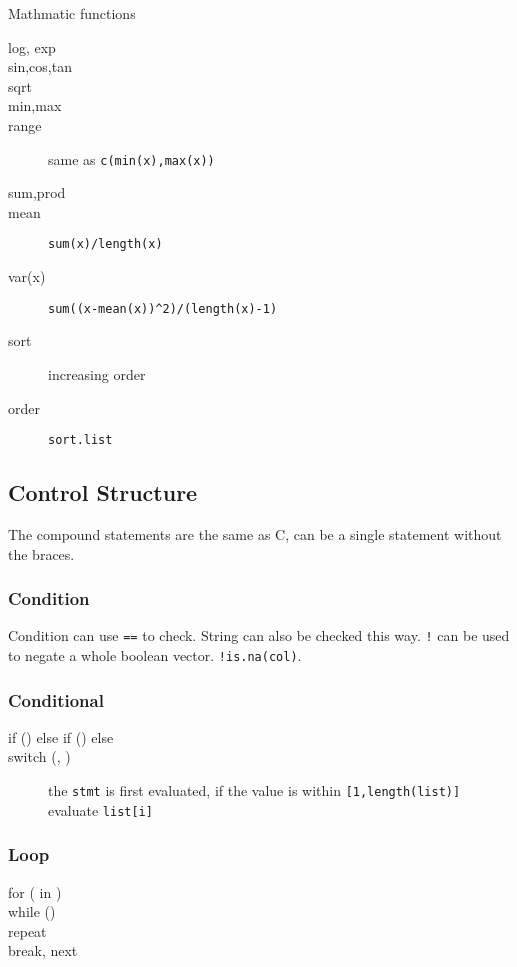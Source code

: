 Mathmatic functions
\begin{description}
\item [log, exp]
\item [sin,cos,tan]
\item [sqrt]
\item [min,max]
\item [range] same as \texttt{c(min(x),max(x))}
\item [sum,prod]
\item [mean] \texttt{sum(x)/length(x)}
\item [var(x)] \verb$sum((x-mean(x))^2)/(length(x)-1)$
\item [sort] increasing order
\item [order] \texttt{sort.list}
\end{description}


\subsection{Control Structure}
The compound statements are the same as C, can be a single statement
without the braces.

\subsubsection{Condition}
Condition can use \texttt{==} to check. String can also be checked
this way. \texttt{!} can be used to negate a whole boolean
vector. \texttt{!is.na(col)}.

\subsubsection{Conditional}

\begin{description}
\item [if ()  else if ()  else ]
\item [switch (, )] the \texttt{stmt} is first
  evaluated, if the value is within \texttt{[1,length(list)]} evaluate
  \texttt{list[i]}
\end{description}

\subsubsection{Loop}
\begin{description}
\item [for ( in ) ]
\item [while () ]
\item [repeat ]
\item [break, next]
\end{description}

